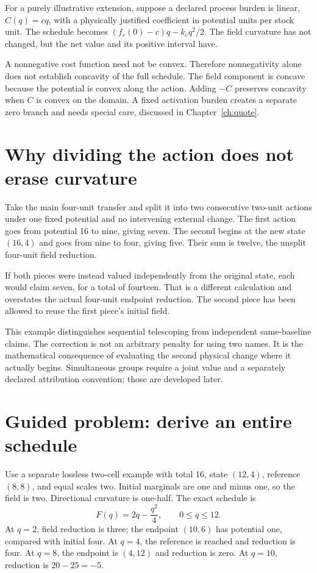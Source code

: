 For a purely illustrative extension, suppose a declared process burden is linear, \(C(q)=cq\), with a physically justified coefficient in potential units per stock unit. The schedule becomes \((f_e(0)-c)q-k_eq^2/2\). The field curvature has not changed, but the net value and its positive interval have.

A nonnegative cost function need not be convex. Therefore nonnegativity alone does not establish concavity of the full schedule. The field component is concave because the potential is convex along the action. Adding \(-C\) preserves concavity when \(C\) is convex on the domain. A fixed activation burden creates a separate zero branch and needs special care, discussed in Chapter~\ref{ch:quote}.

\section{Why dividing the action does not erase curvature}
Take the main four-unit transfer and split it into two consecutive two-unit actions under one fixed potential and no intervening external change. The first action goes from potential 16 to nine, giving seven. The second begins at the new state \((16,4)\) and goes from nine to four, giving five. Their sum is twelve, the unsplit four-unit field reduction.

If both pieces were instead valued independently from the original state, each would claim seven, for a total of fourteen. That is a different calculation and overstates the actual four-unit endpoint reduction. The second piece has been allowed to reuse the first piece's initial field.

This example distinguishes sequential telescoping from independent same-baseline claims. The correction is not an arbitrary penalty for using two names. It is the mathematical consequence of evaluating the second physical change where it actually begins. Simultaneous groups require a joint value and a separately declared attribution convention; those are developed later.

\section{Guided problem: derive an entire schedule}
Use a separate lossless two-cell example with total 16, state \((12,4)\), reference \((8,8)\), and equal scales two. Initial marginals are one and minus one, so the field is two. Directional curvature is one-half. The exact schedule is
\begin{equation}
 F(q)=2q-\frac{q^2}{4},\qquad 0\leq q\leq12.
\end{equation}
At \(q=2\), field reduction is three; the endpoint \((10,6)\) has potential one, compared with initial four. At \(q=4\), the reference is reached and reduction is four. At \(q=8\), the endpoint is \((4,12)\) and reduction is zero. At \(q=10\), reduction is \(20-25=-5\).

